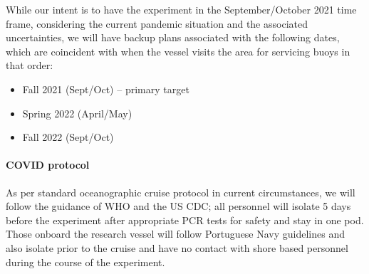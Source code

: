 While our intent is to have the experiment in the September/October 2021
time frame, considering the current pandemic situation and the
associated uncertainties, we will have backup plans associated with the
following dates, which are coincident with when the \inst vessel visits
the \naz area for servicing buoys in that order:

\begin{itemize}[noitemsep,topsep=0pt,parsep=0pt,partopsep=0pt]

\item Fall 2021 (Sept/Oct) -- primary target
\item Spring 2022 (April/May)
\item Fall 2022 (Sept/Oct) 

\end{itemize}  


\paragraph{COVID protocol} As per standard oceanographic cruise
protocol in current circumstances, we will follow the guidance of WHO
and the US CDC; all personnel will isolate 5 days before the
experiment after appropriate PCR tests for safety and stay in one
pod. Those onboard the \inst research vessel will follow Portuguese
Navy guidelines and also isolate prior to the cruise and have no
contact with shore based personnel during the course of the
experiment.
